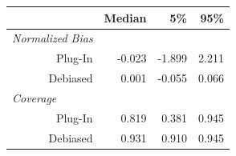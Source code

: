\begin{tabular}{r|rrr}
\toprule
  & Median & 5\% & 95\%\\
\midrule
\multicolumn{1}{l|}{\textit{Normalized Bias}}\\
Plug-In & -0.023 & -1.899 & 2.211\\
Debiased & 0.001 & -0.055 & 0.066\\
\midrule
\multicolumn{1}{l|}{\textit{Coverage}}\\
Plug-In & 0.819 & 0.381 & 0.945\\
Debiased & 0.931 & 0.910 & 0.945\\
\bottomrule
\end{tabular}

